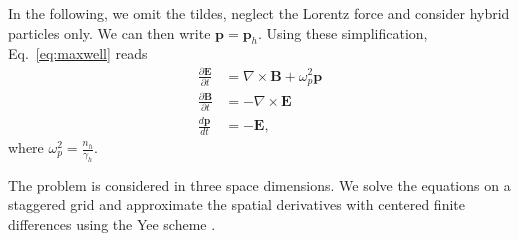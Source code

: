 \documentclass[conference]{IEEEtran}
\newcommand{\ddt}[1]{\frac{d #1}{dt}}
\newcommand{\ppt}[1]{\frac{\partial #1}{\partial t}}
\renewcommand{\~}{\widetilde }
\begin{document}
In the following, we omit the tildes, neglect the Lorentz force and consider hybrid
particles only. We can then write $\textbf{p}=\textbf{p}_h$. Using
these simplification, Eq.~\eqref{eq:maxwell} reads
\begin{subequations}\label{eq:maxwelldl}
\begin{align}
\ppt{\textbf{E}} &= \nabla\times\textbf{B}+\omega_p^2\textbf{p} \label{eq:maxwelldla}\\ 
\ppt{\textbf{B}} &=-\nabla\times\textbf{E} 		   \label{eq:maxwelldlb}\\
\ddt{\textbf{p}} &= -\textbf{E} \label{eq:maxwelldlc},
\end{align}
\end{subequations}
where $\omega_p^2 = \frac{n_h}{\gamma_h}$.

The problem is considered in three space dimensions. We solve the equations on a 
staggered grid and approximate the spatial derivatives with centered finite differences
using the Yee scheme \cite{Yee}.
\end{document}

